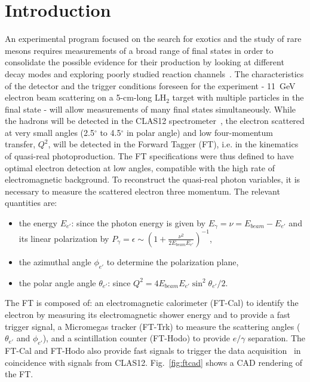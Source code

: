 \section{Introduction}

An experimental program focused on the search for exotics and the study of rare mesons requires measurements
of a broad range of final states in order to consolidate the possible evidence for their production by looking at different
decay modes and exploring poorly studied reaction channels~\cite{mesonex}. The characteristics of the detector
and the trigger conditions foreseen for the experiment - 11~GeV electron beam scattering on a 5-cm-long LH$_2$
target with multiple particles in the final state - will allow  measurements of many final states simultaneously. While
the hadrons will be detected in the CLAS12 spectrometer~\cite{overview}, the electron scattered at very small
angles (2.5$^\circ$ to 4.5$^\circ$ in polar angle) and low four-momentum transfer, $Q^2$,  will be detected in the
Forward Tagger (FT), i.e. in the kinematics of quasi-real photoproduction. The FT  specifications were thus defined
to have optimal electron detection at low angles, compatible with the high rate of electromagnetic background. To
reconstruct the  quasi-real photon variables, it is necessary to measure the scattered electron three momentum.
The relevant quantities are:

\begin{itemize}
\item the energy $E_{e'}$: since the photon energy is given by $E_\gamma =\nu=E_{beam}-E_{e'}$ and its linear
  polarization by $P_\gamma=\epsilon\sim\left( 1+\frac{\nu^2}{2 E_{beam} E_{e'}}\right)^{-1}$,
\item the azimuthal angle $\phi_{e'}$ to determine the polarization plane, 
\item the polar angle angle $\theta_{e'}$: since $Q^2 = 4 E_{beam} E_{e'} \sin^2{\theta_{e'}/2}$.
\end{itemize}

The FT is composed of: an electromagnetic calorimeter  (FT-Cal) to identify the electron by measuring its
electromagnetic shower energy and to provide a fast trigger signal, a Micromegas tracker (FT-Trk) to measure
the scattering angles ($\theta_{e'}$ and $\phi_{e'}$), and a  scintillation counter (FT-Hodo) to provide $e/\gamma$
separation. The FT-Cal and FT-Hodo also provide fast signals to trigger the data acquisition~\cite{daq} in coincidence
with signals from CLAS12. Fig.~\ref{fig:ftcad} shows a CAD rendering of the FT.


